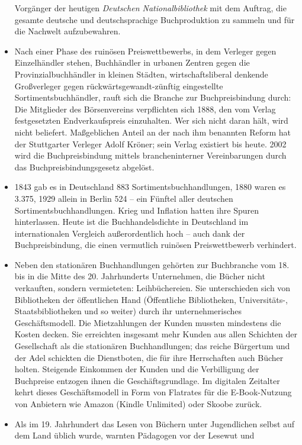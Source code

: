 \documentclass[a4paper,
fontsize=11pt,
oneside,
numbers=noperiodatend,
parskip=half-,
bibliography=totoc,
final
]{scrartcl}
\begin{document}
\begin{itemize}
  Vorgänger der heutigen \emph{Deutschen Nationalbibliothek} mit dem
  Auftrag, die gesamte deutsche und deutschsprachige Buchproduktion zu
  sammeln und für die Nachwelt aufzubewahren.
\item
  Nach einer Phase des ruinösen Preiswettbewerbs, in dem Verleger gegen
  Einzelhändler stehen, Buchhändler in urbanen Zentren gegen die
  Provinzialbuchhändler in kleinen Städten, wirtschaftsliberal denkende
  Großverleger gegen rückwärtsgewandt-zünftig eingestellte
  Sortimentsbuchhändler, rauft sich die Branche zur Buchpreisbindung
  durch: Die Mitglieder des Börsenvereins verpflichten sich 1888, den
  vom Verlag festgesetzten Endverkaufspreis einzuhalten. Wer sich nicht
  daran hält, wird nicht beliefert. Maßgeblichen Anteil an der nach ihm
  benannten Reform hat der Stuttgarter Verleger Adolf Kröner; sein
  Verlag existiert bis heute. 2002 wird die Buchpreisbindung mittels
  brancheninterner Vereinbarungen durch das Buchpreisbindungsgesetz
  abgelöst.
\item
  1843 gab es in Deutschland 883 Sortimentsbuchhandlungen, 1880 waren es
  3.375, 1929 allein in Berlin 524 -- ein Fünftel aller deutschen
  Sortimentsbuchhandlungen. Krieg und Inflation hatten ihre Spuren
  hinterlassen. Heute ist die Buchhandelsdichte in Deutschland im
  internationalen Vergleich außerordentlich hoch -- auch dank der
  Buchpreisbindung, die einen vermutlich ruinösen Preiswettbewerb
  verhindert.
\item
  Neben den stationären Buchhandlungen gehörten zur Buchbranche vom 18.
  bis in die Mitte des 20. Jahrhunderts Unternehmen, die Bücher nicht
  verkauften, sondern vermieteten: Leihbüchereien. Sie unterschieden
  sich von Bibliotheken der öffentlichen Hand (Öffentliche Bibliotheken,
  Universitäts-, Staatsbibliotheken und so weiter) durch ihr
  unternehmerisches Geschäftsmodell. Die Mietzahlungen der Kunden
  mussten mindestens die Kosten decken. Sie erreichten insgesamt mehr
  Kunden aus allen Schichten der Gesellschaft als die stationären
  Buchhandlungen; das reiche Bürgertum und der Adel schickten die
  Dienstboten, die für ihre Herrschaften auch Bücher holten. Steigende
  Einkommen der Kunden und die Verbilligung der Buchpreise entzogen
  ihnen die Geschäftsgrundlage. Im digitalen Zeitalter kehrt dieses
  Geschäftsmodell in Form von Flatrates für die E-Book-Nutzung von
  Anbietern wie Amazon (Kindle Unlimited) oder Skoobe zurück.
\item
  Als im 19. Jahrhundert das Lesen von Büchern unter Jugendlichen selbst
  auf dem Land üblich wurde, warnten Pädagogen vor der Lesewut und

\end{itemize}
\end{document}

